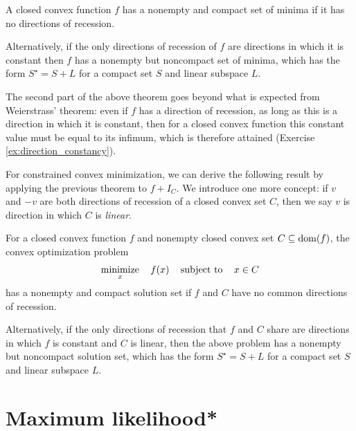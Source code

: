 \begin{Theorem}
\label{thm:weierstrass_convex}
A closed convex function $f$ has a nonempty and compact set of minima if it 
has no directions of recession. 

\setlength{\parindent}{\normalparindent}
Alternatively, if the only directions of recession of $f$ are directions in
which it is constant then $f$ has a nonempty but noncompact set of minima, which
has the form $S^\star = S + L$ for a compact set $S$ and linear subspace $L$.  
\end{Theorem}

The second part of the above theorem goes beyond what is expected from 
Weierstrass' theorem: even if $f$ has a direction of recession, as long as this
is a direction in which it is constant, then for a closed convex function this
constant value must be equal to its infimum, which is therefore attained
(Exercise \ref{ex:direction_constancy}).  

For constrained convex minimization, we can derive the following result by
applying the previous theorem to $f + I_C$. We introduce one more concept: if
$v$ and $-v$ are both directions of recession of a closed convex set $C$, then 
we say $v$ is direction in which $C$ is \emph{linear}.

\begin{Corollary}
\label{cor:weierstrass_convex_constrained}
For a closed convex function $f$ and nonempty closed convex set $C \subseteq 
\operatorname{dom}(f)$, the convex optimization problem    
\[
\operatorname*{minimize}_x \quad f(x) \quad \operatorname{subject\,\,to} \quad x \in C
\]
has a nonempty and compact solution set if $f$ and $C$ have no common 
directions of recession. 

\setlength{\parindent}{\normalparindent}
Alternatively, if the only directions of recession that $f$ and $C$ share are
directions in which $f$ is constant and $C$ is linear, then the above problem
has a nonempty but noncompact solution set, which has the form $S^\star = S + L$
for a compact set $S$ and linear subspace $L$.   
\end{Corollary}

\section{Maximum likelihood*}
\label{sec:maximum_likelihood}

